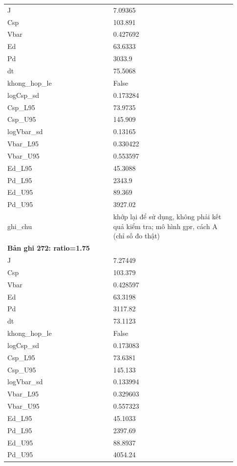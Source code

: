 \begin{longtable}{p{0.43\linewidth}p{0.50\linewidth}}
J & 7.09365 \\
Csp & 103.891 \\
Vbar & 0.427692 \\
Ed & 63.6333 \\
Pd & 3033.9 \\
dt & 75.5068 \\
khong\_\allowbreak hop\_\allowbreak le & False \\
logCsp\_\allowbreak sd & 0.173284 \\
Csp\_\allowbreak L95 & 73.9735 \\
Csp\_\allowbreak U95 & 145.909 \\
logVbar\_\allowbreak sd & 0.13165 \\
Vbar\_\allowbreak L95 & 0.330422 \\
Vbar\_\allowbreak U95 & 0.553597 \\
Ed\_\allowbreak L95 & 45.3088 \\
Pd\_\allowbreak L95 & 2343.9 \\
Ed\_\allowbreak U95 & 89.369 \\
Pd\_\allowbreak U95 & 3927.02 \\
ghi\_\allowbreak chu & khớp lại để sử dụng, không phải kết quả kiểm tra; mô hình gpr, cách A (chỉ số đo thật) \\
\midrule
\multicolumn{2}{p{0.95\linewidth}}{\textbf{Bản ghi 272: ratio=1.75}} \\
J & 7.27449 \\
Csp & 103.379 \\
Vbar & 0.428597 \\
Ed & 63.3198 \\
Pd & 3117.82 \\
dt & 73.1123 \\
khong\_\allowbreak hop\_\allowbreak le & False \\
logCsp\_\allowbreak sd & 0.173083 \\
Csp\_\allowbreak L95 & 73.6381 \\
Csp\_\allowbreak U95 & 145.133 \\
logVbar\_\allowbreak sd & 0.133994 \\
Vbar\_\allowbreak L95 & 0.329603 \\
Vbar\_\allowbreak U95 & 0.557323 \\
Ed\_\allowbreak L95 & 45.1033 \\
Pd\_\allowbreak L95 & 2397.69 \\
Ed\_\allowbreak U95 & 88.8937 \\
Pd\_\allowbreak U95 & 4054.24 \\

\end{longtable}
